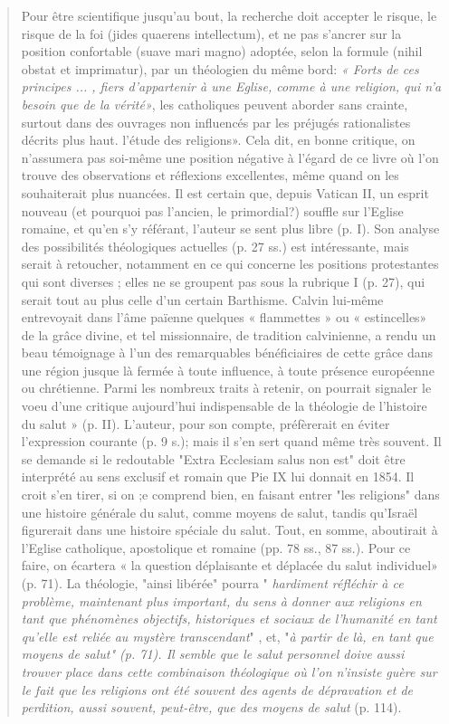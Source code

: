 \begin{quote}
Pour être scientifique jusqu'au bout, la recherche doit accepter le risque,
le risque de la foi (jides quaerens intellectum), et ne pas s'ancrer sur la
position confortable (suave mari magno) adoptée, selon la formule (nihil
obstat et imprimatur), par un théologien du même bord: \textit{« Forts de ces principes
... , fiers d'appartenir à une Eglise, comme à une religion, qui n'a besoin
que de la vérité»}, les catholiques peuvent aborder sans crainte, surtout dans
des ouvrages non influencés par les préjugés rationalistes décrits plus haut.
l'étude des religions». 
Cela dit, en bonne critique, on n'assumera pas soi-même une position négative
à l'égard de ce livre où l'on trouve des observations et réflexions excellentes,
même quand on les souhaiterait plus nuancées. Il est certain que,
depuis Vatican II, un esprit nouveau (et pourquoi pas l'ancien, le primordial?)
souffle sur l'Eglise romaine, et qu'en s'y référant, l'auteur se sent plus
libre (p. I). Son analyse des possibilités théologiques actuelles (p. 27 ss.) est
intéressante, mais serait à retoucher, notamment en ce qui concerne les positions
protestantes qui sont diverses ; elles ne se groupent pas sous la rubrique
I (p. 27), qui serait tout au plus celle d'un certain Barthisme. Calvin lui-même
entrevoyait dans l'âme païenne quelques « flammettes » ou « estincelles» de la grâce divine, et tel missionnaire, de tradition calvinienne, a rendu
un beau témoignage à l'un des remarquables bénéficiaires de cette grâce dans
une région jusque là fermée à toute influence, à toute présence européenne ou
chrétienne. 
Parmi les nombreux traits à retenir, on pourrait signaler le voeu d'une
critique aujourd'hui indispensable de la théologie de l'histoire du salut »
(p. II). L'auteur, pour son compte, préfèrerait en éviter l'expression courante
(p. 9 s.); mais il s'en sert quand même très souvent. Il se demande si le redoutable
 "Extra Ecclesiam salus non est" doit être interprété au sens exclusif
et romain que Pie IX lui donnait en 1854. Il croit s'en tirer, si on ;e
comprend bien, en faisant entrer "les religions" dans une histoire générale
du salut, comme moyens de salut, tandis qu'Israël figurerait dans une histoire spéciale du salut. Tout, en somme, aboutirait à l'Eglise catholique, apostolique
et romaine (pp. 78 ss., 87 ss.). Pour ce faire, on écartera « la question déplaisante
et déplacée du salut individuel» (p. 71). La théologie, "ainsi libérée"
pourra "\textit{ hardiment réfléchir à ce problème, maintenant plus important,
du sens à donner aux religions en tant que phénomènes objectifs, historiques
et sociaux de l'humanité en tant qu'elle est reliée au mystère transcendant}" ,
et,  "\textit{à partir de là, en tant que moyens de salut" (p. 71). Il semble que le
salut personnel doive aussi trouver place dans cette combinaison théologique
où l'on n'insiste guère sur le fait que les religions ont été souvent des agents
de dépravation et de perdition, aussi souvent, peut-être, que des moyens de
salut} (p. 114).
\end{quote}
